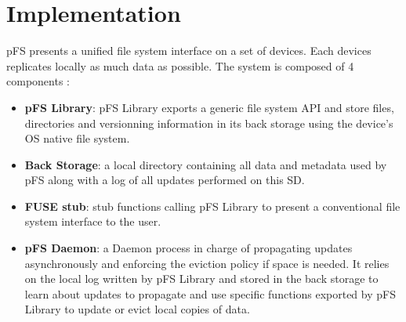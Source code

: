 
\section{Implementation}
\label{sec:impl}



pFS presents a unified file system interface on a set of devices. Each
devices replicates locally as much data as possible. The system is
composed of 4 components :
\begin{itemize}
\item \textbf{pFS Library}: pFS Library exports a generic file system
  API and store files, directories and versionning information in its
  back storage using the device's OS native file system.
\item \textbf{Back Storage}: a local directory containing all data and
  metadata used by pFS along with a log of all updates performed on
  this SD.
\item \textbf{FUSE stub}: stub functions calling pFS Library to
  present a conventional file system interface to the user.
\item \textbf{pFS Daemon}: a Daemon process in charge of propagating
  updates asynchronously and enforcing the eviction policy if space is
  needed. It relies on the local log written by pFS Library and stored
  in the back storage to learn about updates to propagate and use
  specific functions exported by pFS Library to update or evict local
  copies of data.
\end{itemize}


